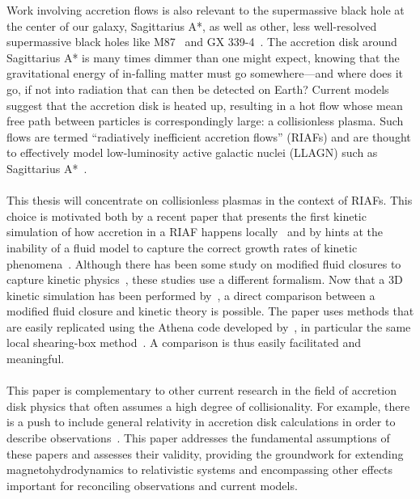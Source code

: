 Work involving accretion flows is also relevant to the supermassive black hole at the center of our galaxy, Sagittarius A*, as well as other, less well-resolved supermassive black holes like M87~\cite{Ressler2015,Oezel2001,Foucart2015,Broderick2015} and GX 339-4~\cite{Plant2014}. The accretion disk around Sagittarius A* is many times dimmer than one might expect, knowing that the gravitational energy of in-falling matter must go somewhere---and where does it go, if not into radiation that can then be detected on Earth? Current models suggest that the accretion disk is heated up, resulting in a hot flow whose mean free path between particles is correspondingly large: a collisionless plasma. Such flows are termed ``radiatively inefficient accretion flows'' (RIAFs) and are thought to effectively model low-luminosity active galactic nuclei (LLAGN) such as Sagittarius A*~\cite{Rohan1998,Broderick2011,Broderick2009,Dexter2013,Yuan2003}. \\
\\
This thesis will concentrate on collisionless plasmas in the context of RIAFs. This choice is motivated both by a recent paper that presents the first kinetic simulation of how accretion in a RIAF happens locally~\cite{Kunz2016} and by hints at the inability of a fluid model to capture the correct growth rates of kinetic phenomena~\cite{Sharma2004}. Although there has been some study on modified fluid closures to capture kinetic physics~\cite{Sharma2006,Sharma2007,Sharma2003,SharmaThesis}, these studies use a different formalism. Now that a 3D kinetic simulation has been performed by~\citet{Kunz2016}, a direct comparison between a modified fluid closure and kinetic theory is possible. The paper uses methods that are easily replicated using the Athena code developed by~\citet{Stone2008}, in particular the same local shearing-box method~\cite{Stone2010}. A comparison is thus easily facilitated and meaningful. \\
\\
This paper is complementary to other current research in the field of accretion disk physics that often assumes a high degree of collisionality. For example, there is a push to include general relativity in accretion disk calculations in order to describe observations~\cite{Moscibrodzka2014,Ressler2015,Shiokawa2013,Sadowski2016,Niedzwiecki2014,Narayan1998}. This paper addresses the fundamental assumptions of these papers and assesses their validity, providing the groundwork for extending magnetohydrodynamics to relativistic systems and encompassing other effects important for reconciling observations and current models.\\
